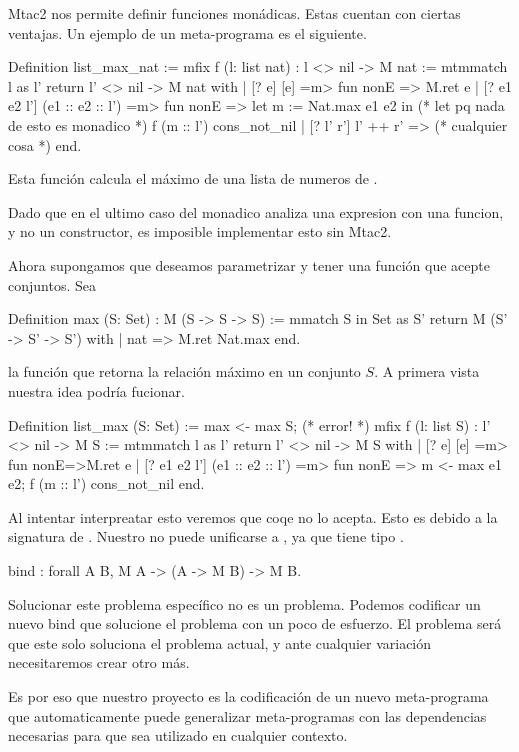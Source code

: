 Mtac2 nos permite definir funciones monádicas. Estas cuentan con ciertas ventajas. Un ejemplo de un meta-programa es el siguiente.

\begin{coqe}
Definition list_max_nat :=
  mfix f (l: list nat) : l <> nil -> M nat :=
    mtmmatch l as l' return l' <> nil -> M nat with
    | [? e] [e] =m> fun nonE => M.ret e
    | [? e1 e2 l'] (e1 :: e2 :: l') =m> fun nonE =>
      let m := Nat.max e1 e2 in (* let pq nada de esto es monadico *)
      f (m :: l') cons_not_nil
    | [? l' r'] l' ++ r' => (* cualquier cosa *) 
    end.
\end{coqe}

Esta función calcula el máximo de una lista de numeros de \nat.

Dado que en el ultimo caso del  monadico analiza una expresion
con una funcion, y no un constructor, es imposible implementar esto sin Mtac2.

Ahora supongamos que deseamos parametrizar \nat y tener una función que acepte conjuntos. Sea
\begin{coqe}
Definition max (S: Set) : M (S -> S -> S) :=
  mmatch S in Set as S' return M (S' -> S' -> S') with
  | nat => M.ret Nat.max
  end.
\end{coqe}

la función que retorna la relación máximo en un conjunto $S$. A primera vista nuestra idea podría fucionar.

\begin{coqe}
Definition list_max (S: Set)  :=
  max <- max S; (* error! *)
  mfix f (l: list S) : l' <> nil -> M S :=
    mtmmatch l as l' return l' <> nil -> M S with
    | [? e] [e] =m> fun nonE=>M.ret e
    | [? e1 e2 l'] (e1 :: e2 :: l') =m> fun nonE =>
      m <- max e1 e2;
      f (m :: l') cons_not_nil
    end.
\end{coqe}

Al intentar interpreatar esto veremos que coqe no lo acepta. Esto es debido a la signatura de . Nuestro  no puede
unificarse a , ya que tiene tipo .

\begin{coqe}
bind : forall A B, M A -> (A -> M B) -> M B.
\end{coqe}

Solucionar este problema específico no es un problema. Podemos codificar un nuevo bind que solucione el problema con un poco de esfuerzo.
El problema será que este solo soluciona el problema actual, y ante cualquier variación necesitaremos crear otro  más.

Es por eso que nuestro proyecto es la codificación de un nuevo meta-programa  que automaticamente puede generalizar meta-programas
con las dependencias necesarias para que sea utilizado en cualquier contexto.

